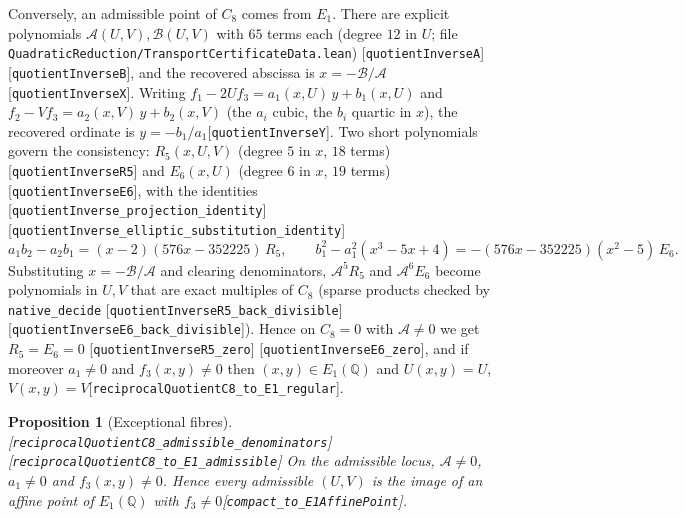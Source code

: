 \documentclass[10pt]{article}
\newtheorem{proposition}[theorem]{Proposition}
\theoremstyle{definition}
\theoremstyle{remark}
\newcommand{\Q}{\mathbb{Q}}
\newcommand{\leanref}[1]{{\scriptsize\textup{[\texttt{#1}]}}\allowbreak}
\newcommand{\leanfile}[1]{\texttt{\small #1}}
\begin{document}
Conversely, an admissible point of $C_8$ comes from $E_1$.  There are
explicit polynomials $\mathcal{A}(U,V),\mathcal{B}(U,V)$ with $65$ terms each
(degree $12$ in $U$; file \leanfile{Quadratic\allowbreak Reduction/\allowbreak Transport\allowbreak Certificate\allowbreak Data.\allowbreak lean})
\leanref{quotient\allowbreak Inverse\allowbreak A} \leanref{quotient\allowbreak Inverse\allowbreak B}, and the recovered
abscissa is $x=-\mathcal{B}/\mathcal{A}$\leanref{quotient\allowbreak Inverse\allowbreak X}.
Writing $f_1-2Uf_3=a_1(x,U)\,y+b_1(x,U)$ and $f_2-Vf_3=a_2(x,V)\,y+b_2(x,V)$
(the $a_i$ cubic, the $b_i$ quartic in $x$), the recovered ordinate is
$y=-b_1/a_1$\leanref{quotient\allowbreak Inverse\allowbreak Y}.  Two short polynomials govern the
consistency: $R_5(x,U,V)$ (degree $5$ in $x$, $18$ terms)
\leanref{quotient\allowbreak Inverse\allowbreak R5} and $E_6(x,U)$ (degree $6$ in $x$, $19$ terms)
\leanref{quotient\allowbreak Inverse\allowbreak E6}, with the identities
\leanref{quotient\allowbreak Inverse\_\allowbreak projection\_\allowbreak identity} \leanref{quotient\allowbreak Inverse\_\allowbreak elliptic\_\allowbreak substitution\_\allowbreak identity}
\[
 a_1b_2-a_2b_1=(x-2)(576x-352225)\,R_5,\qquad
 b_1^2-a_1^2(x^3-5x+4)=-(576x-352225)(x^2-5)\,E_6 .
\]
Substituting $x=-\mathcal{B}/\mathcal{A}$ and clearing denominators,
$\mathcal{A}^5R_5$ and $\mathcal{A}^6E_6$ become polynomials in $U,V$ that are
exact multiples of $C_8$ (sparse products checked by \texttt{native\_\allowbreak decide}
\leanref{quotient\allowbreak Inverse\allowbreak R5\_\allowbreak back\_\allowbreak divisible} \leanref{quotient\allowbreak Inverse\allowbreak E6\_\allowbreak back\_\allowbreak divisible}).
Hence on $C_8=0$ with $\mathcal{A}\ne0$ we get $R_5=E_6=0$
\leanref{quotient\allowbreak Inverse\allowbreak R5\_\allowbreak zero} \leanref{quotient\allowbreak Inverse\allowbreak E6\_\allowbreak zero}, and if
moreover $a_1\ne0$ and $f_3(x,y)\ne0$ then $(x,y)\in E_1(\Q)$ and
$U(x,y)=U$, $V(x,y)=V$\leanref{reciprocal\allowbreak Quotient\allowbreak C8\_\allowbreak to\_\allowbreak E1\_\allowbreak regular}.

\begin{proposition}[Exceptional fibres]\label{prop:exceptional}
\leanref{reciprocal\allowbreak Quotient\allowbreak C8\_\allowbreak admissible\_\allowbreak denominators} \leanref{reciprocal\allowbreak Quotient\allowbreak C8\_\allowbreak to\_\allowbreak E1\_\allowbreak admissible}
On the admissible locus, $\mathcal{A}\ne0$, $a_1\ne0$ and $f_3(x,y)\ne0$.
Hence every admissible $(U,V)$ is the image of an affine point of $E_1(\Q)$
with $f_3\ne0$\leanref{compact\_\allowbreak to\_\allowbreak E1\allowbreak Affine\allowbreak Point}.
\end{proposition}
\end{document}

